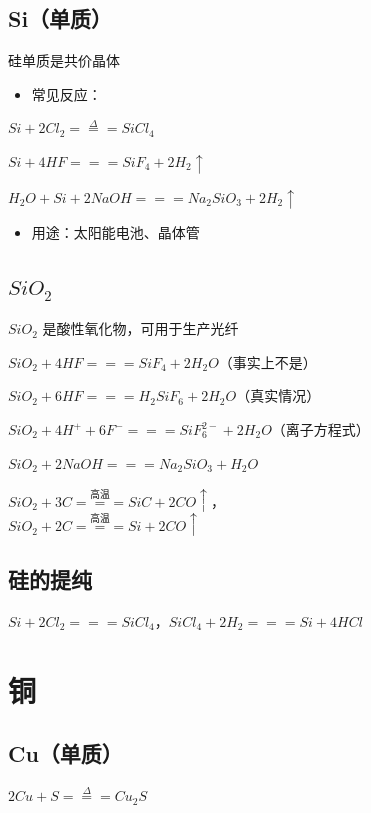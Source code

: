 \documentclass[UTF8,zihao=-4,openany]{ctexbook}
\begin{document}
\subsection{Si（单质）}
硅单质是共价晶体\par

\begin{itemize}
\item 常见反应：
\end{itemize}

$Si+2Cl_2\stackrel{\Delta}{=\!=\!=}SiCl_4$\par

$Si+4HF=\!=\!=SiF_4+2H_2\uparrow$\par

$H_2O+Si+2NaOH=\!=\!=Na_2SiO_3+2H_2\uparrow$\par

\begin{itemize}
\item 用途：太阳能电池、晶体管
\end{itemize}
\subsection{$SiO_2$}
$SiO_2$ 是酸性氧化物，可用于生产光纤\par

$SiO_2+4HF=\!=\!=SiF_4+2H_2O$（事实上不是）\par

$SiO_2+6HF=\!=\!=H_2SiF_6+2H_2O$（真实情况）\par

$SiO_2+4H^++6F^-=\!=\!=SiF_6^{2-}+2H_2O$（离子方程式）\par

$SiO_2+2NaOH=\!=\!=Na_2SiO_3+H_2O$\par

$SiO_2+3C\stackrel{\mbox{高温}}{=\!=\!=}SiC+2CO\uparrow$，\\[0.25em]
\hspace*{2em}$SiO_2+2C\stackrel{\mbox{高温}}{=\!=\!=}Si+2CO\uparrow$\par
\subsection{硅的提纯}
$Si+2Cl_2=\!=\!=SiCl_4$，$SiCl_4+2H_2=\!=\!=Si+4HCl$\par
\section{铜}
\subsection{Cu（单质）}
$2Cu+S\stackrel{\Delta}{=\!=\!=}Cu_2S$\par
\end{document}

